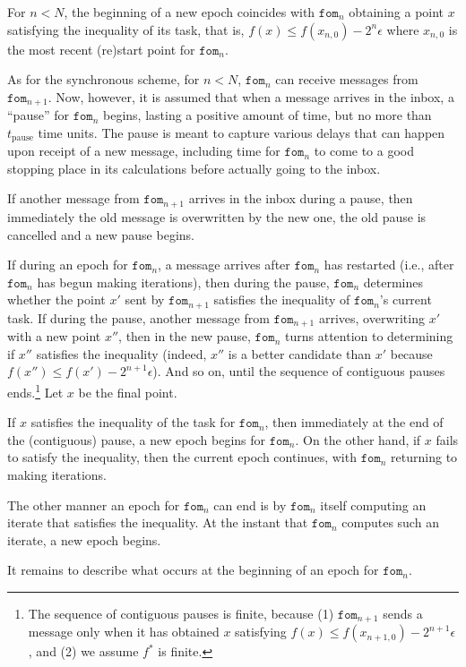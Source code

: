 \documentclass[reqno, 11pt]{amsart}
\numberwithin{equation}{section}
\newcommand{\fom}{\mathtt{fom}}
\newcommand{\tpause}{t_{\mathrm{pause}}}
\begin{document}
For $ n < N $, the beginning of a new epoch coincides with $ \fom_n $ obtaining a point $ x $ satisfying the inequality of its task, that is, $ f(x) \leq f(x_{n,0}) - 2^n \epsilon $ where $ x_{n,0} $ is the most recent (re)start point for $ \fom_n $. 

As for the synchronous scheme, for $ n < N $, $ \fom_n $ can receive messages from $ \fom_{n+1} $. Now, however, it is assumed that when a message arrives in the inbox, 
a ``pause'' for $ \fom_n $ begins, lasting a positive amount of time, but no more than $ \tpause $ time units. The pause is meant to capture various delays that can happen upon receipt of a new message, including time for $ \fom_n $ to come to a good stopping place in its calculations before actually going to the inbox.

If another message from $ \fom_{n+1} $ arrives in the inbox during a pause, then immediately the old message is overwritten by the new one, the old pause is cancelled and a new pause begins. 

If during an epoch for $ \fom_n $, a message arrives after $ \fom_n $ has restarted (i.e., after $ \fom_n $ has begun making iterations), then during the pause, $ \fom_n $ determines whether the point $ x' $ sent by $ \fom_{n+1} $ satisfies the inequality of $ \fom_n $'s current task.  If during the pause, another message from $ \fom_{n+1} $ arrives, overwriting $ x' $ with a new point $ x'' $, then in the new pause, $ \fom_n $ turns attention to determining if $ x'' $ satisfies the inequality (indeed, $ x'' $  is a better candidate than $ x' $  because $ f(x'') \leq  f(x') - 2^{n+1} \epsilon $). And so on, until the sequence of contiguous pauses ends.\footnote{The sequence of contiguous pauses is finite, because (1) $ \fom_{n+1} $ sends a message only when it has obtained $ x $ satisfying $ f(x) \leq f(x_{n+1,0}) - 2^{n+1} \epsilon $, and (2) we assume $ f^* $ is finite.} Let $ x $ be the final point.

If $ x $ satisfies the inequality of the task for $ \fom_n $, then immediately at the end of the (contiguous) pause, a new epoch begins for $ \fom_n $. On the other hand, if $ x $ fails to satisfy the inequality, then the current epoch continues, with $ \fom_n $ returning to making iterations.

The other manner an epoch for $ \fom_n $ can end is by $ \fom_n $ itself computing an iterate that satisfies the inequality. At the instant that $ \fom_n $ computes such an iterate, a new epoch begins.

It remains to describe what occurs at the beginning of an epoch for $ \fom_n $. 
\end{document}
